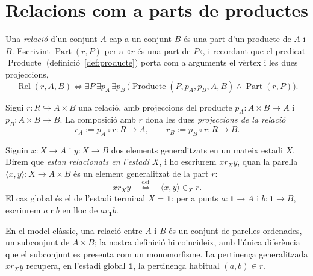 \section{Relacions com a parts de productes}\label{sec:relacions}

\begin{definicio}[Relació]\label{def:relacio}
Una \emph{relació} d'un conjunt \(A\) cap a un conjunt \(B\) és una part d'un producte de \(A\) i \(B\). Escrivint \(\operatorname{Part}(r,P)\) per a «\(r\) és una part de \(P\)», i recordant que el predicat \(\operatorname{Producte}\) (definició~\ref{def:producte}) porta com a arguments el vèrtex i les dues projeccions,
\[
\operatorname{Rel}(r,A,B)
\iff
\exists P\,\exists p_A\,\exists p_B\,
\bigl(\operatorname{Producte}(P,p_A,p_B,A,B)\land\operatorname{Part}(r,P)\bigr).
\]
\end{definicio}

Sigui \(r\colon R\hookrightarrow A\times B\) una relació, amb projeccions del producte \(p_A\colon A\times B\to A\) i \(p_B\colon A\times B\to B\). La composició amb \(r\) dona les dues \emph{projeccions de la relació}
\[
r_A:=p_A\circ r\colon R\to A,
\qquad
r_B:=p_B\circ r\colon R\to B.
\]

\begin{notacio}\label{not:relacio}
Siguin \(x\colon X\to A\) i \(y\colon X\to B\) dos elements generalitzats en un mateix estadi \(X\). Direm que \emph{estan relacionats en l'estadi \(X\)}, i ho escriurem \(x\mathrel{r_X}y\), quan la parella \(\langle x,y\rangle\colon X\to A\times B\) és un element generalitzat de la part \(r\):
\[
x\mathrel{r_X}y
\quad\overset{\text{def}}{\Longleftrightarrow}\quad
\langle x,y\rangle\in_X r.
\]
El cas global és el de l'estadi terminal \(X=\mathbf1\): per a punts \(a\colon\mathbf1\to A\) i \(b\colon\mathbf1\to B\), escriurem \(a\mathrel{r}b\) en lloc de \(a\mathrel{r_{\mathbf1}}b\).
\end{notacio}

\begin{observacio}\label{obs:relacio-classica}
En el model clàssic, una relació entre \(A\) i \(B\) és un conjunt de parelles ordenades, un subconjunt de \(A\times B\); la nostra definició hi coincideix, amb l'única diferència que el subconjunt es presenta com un monomorfisme. La pertinença generalitzada \(x\mathrel{r_X}y\) recupera, en l'estadi global \(\mathbf1\), la pertinença habitual \((a,b)\in r\).
\end{observacio}

